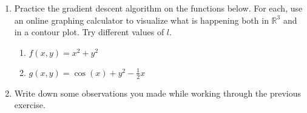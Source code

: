 \documentclass[12pt]{amsart}
\newcommand{\R}{\mathbb{R}}
\theoremstyle{definition}
\newtheorem*{definition}{Definition}
\begin{document}
\begin{enumerate}[itemsep=2.5em,leftmargin=0pt]
\vspace{2.5em}

\begin{definition}
    {\bf Gradient descent} is an algorithmic approach to searching for a minimum of a function. Let $f(x_1,x_2,\ldots,x_n)$ be a differentiable function and use vector notation to denote the point $\mathbf{x}=(x_1,x_2,\ldots,x_n)$. Then, a {\bf gradient descent step} is
    \begin{equation*}
        \mathbf{x}_{k+1} = \mathbf{x}_{k} - l\nabla f(\mathbf{x}_{k})
    \end{equation*}
    where $l$ is some constant which, in machine learning, we call the {\bf learning rate}. Note here we get a sequence of points $\{\mathbf{x}_0,\mathbf{x}_1,\ldots\}$. For ``nice'' situations, with $x_0$ and $l$ chosen efficiently, this sequence converges to a local minimum of $f$.

\end{definition}

\vspace{-2em}

\item Practice the gradient descent algorithm on the functions below. For each, use an online graphing calculator to visualize what is happening both in $\R^3$ and in a contour plot. Try different values of $l$.
\begin{enumerate}
    \item $f(x,y)=x^2+y^2$
    \item $g(x,y)=\cos(x)+y^2-\frac{1}{2}x$
\end{enumerate}


\item Write down some observations you made while working through the previous exercise.



\end{enumerate}
\end{document}
